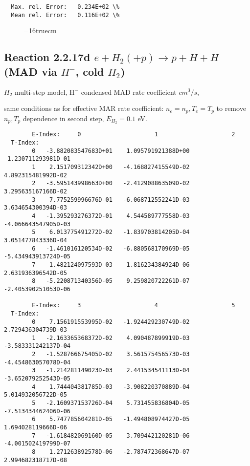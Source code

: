 \documentclass[12pt,dvipdfmx]{article}
\begin{document}
{\begin{small}
\begin{verbatim}
  Max. rel. Error:   0.234E+02 \%
  Mean rel. Error:   0.116E+02 \%

\end{verbatim}\end{small}
\begin{figure} \label{2.2.17mar}
\epsfxsize=16truecm
\end{figure}
\newpage
\subsection{
Reaction 2.2.17d   $e + H_2 (+p)   \rightarrow p + H + H  $ (MAD via $H^-$, cold $H_2$)
}

$H_2$ multi-step model, H$^-$ condensed MAD rate coefficient $cm^3/s$,

same conditions as for effective MAR rate coefficient: $n_e=n_p, T_e=T_p$ to remove $n_p,T_p$ dependence in second step,  $E_{H_2}=0.1$ eV.

\begin{small}\begin{verbatim}
        E-Index:     0                     1                     2
  T-Index:
        0   -3.882083547683D+01    1.095791921388D+00   -1.230711293981D-01
        1    2.151709312342D+00   -4.168827415549D-02    4.892315481992D-02
        2   -3.595143998663D+00   -2.412908863509D-02    3.295635167166D-02
        3    7.775259996676D-01   -6.068712552241D-03    3.634654300394D-03
        4   -1.395293276372D-01    4.544589777558D-03   -4.066643547905D-03
        5    6.013775491272D-02   -1.839703814205D-04    3.051477843336D-04
        6   -1.461016120534D-02   -6.880568170969D-05   -5.434943913724D-05
        7    1.482124097593D-03   -1.816234384924D-06    2.631936396542D-05
        8   -5.220871340356D-05    9.259820722261D-07   -2.405390251053D-06

        E-Index:     3                     4                     5
  T-Index:
        0    7.156191553995D-02   -1.924429230749D-02    2.729436304739D-03
        1   -2.163365368372D-02    4.090487899919D-03   -3.583331242137D-04
        2   -1.528766675405D-02    3.561575456573D-03   -4.454863057078D-04
        3   -1.214281149023D-03    2.441534541113D-04   -3.652079252543D-05
        4    1.744404381785D-03   -3.908220370889D-04    5.014932056722D-05
        5   -2.160937153726D-04    5.731455836804D-05   -7.513434462406D-06
        6    5.747785604281D-05   -1.494808974427D-05    1.694028119666D-06
        7   -1.618482069160D-05    3.709442120281D-06   -4.001502419799D-07
        8    1.271263892578D-06   -2.787472368647D-07    2.994682318717D-08


\end{verbatim}
\end{small}}
\end{document}
